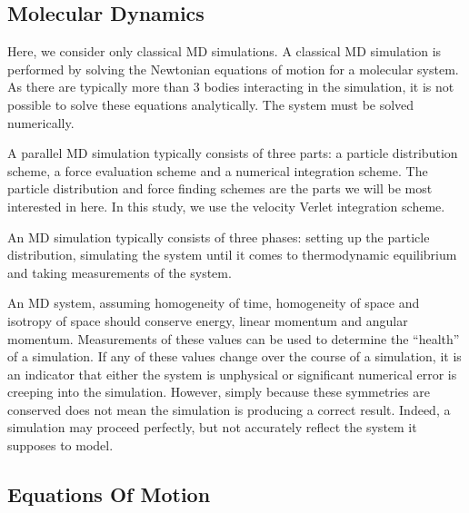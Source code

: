 %
%
\subsection{Molecular Dynamics}


Here, we consider only classical MD simulations.
%
A classical MD simulation is performed by
solving the Newtonian equations of motion for
a molecular system.
%
As there are typically more than 3 bodies interacting in the simulation,
it is not possible to solve these equations analytically.
%
The system must be solved numerically.


%
A parallel MD simulation typically consists of three parts:
a particle distribution scheme,
a force evaluation scheme and
a numerical integration scheme.
%
The particle distribution and force finding schemes are
the parts we will be most interested in here.
%
In this study, we use the velocity Verlet integration scheme.


%
An MD simulation typically consists of three phases:
setting up the particle distribution,
simulating the system until it comes to thermodynamic equilibrium and
taking measurements of the system.


%
An MD system,
assuming homogeneity of time,
homogeneity of space and
isotropy of space
should conserve energy, linear momentum and angular momentum.
%
Measurements of these values can be used to
determine the ``health'' of a simulation.
%
If any of these values change over the course of a simulation,
it is an indicator that either the system is unphysical or
significant numerical error is creeping into the simulation.
%
However, simply because these symmetries are conserved does not mean
the simulation is producing a correct result.
%
Indeed, a simulation may proceed perfectly, but not accurately reflect
the system it supposes to model.




\subsection{Equations Of Motion}

